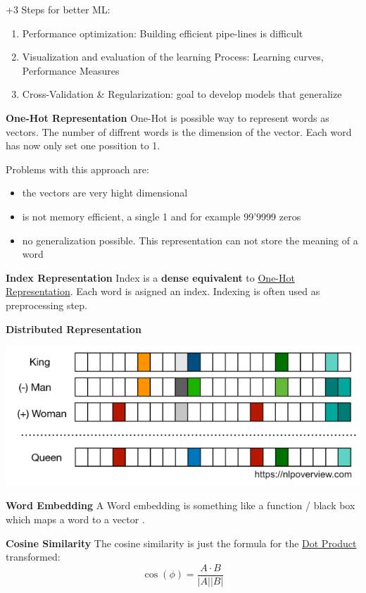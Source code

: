 \documentclass[11pt,twoside,landscape]{article}
\begin{document}
\begin{multicols}{3}
+3 Steps for better ML:
\begin{enumerate}
\item Performance optimization: Building efficient pipe-lines is difficult
\item Visualization and evaluation of the learning Process: Learning curves, Performance Measures
\item Cross-Validation \& Regularization: goal to develop models that generalize
\end{enumerate}



\textbf{One-Hot Representation}
One-Hot is possible way to represent words as vectors.
The number of diffrent words is the dimension of the vector.
Each word has now only set one possition to 1.

Problems with this approach are:
\begin{itemize}
\item the vectors are very hight dimensional
\item is not memory efficient, a single 1 and for example 99'9999 zeros
\item no generalization possible. This representation can not store the meaning of a word
\end{itemize}


\textbf{Index Representation}
Index is a \textbf{dense equivalent} to \href{../../../roam/20211004181318-one_hot_representation.org}{One-Hot Representation}.
Each word is asigned an index.
Indexing is often used as preprocessing step.


\textbf{Distributed Representation}
\begin{center}
\includegraphics[width=.9\linewidth]{img/distributed_representation.png}
\end{center}


\textbf{Word Embedding}
A Word embedding is something like a function / black box which maps a word to a vector .


\textbf{Cosine Similarity}
The cosine similarity is just the formula for the \href{../../../roam/20211004182731-dot_product.org}{Dot Product} transformed:
$$
\cos(\phi) = \frac{A \cdot B}{|A||B|}
$$


\end{multicols}
\end{document}
